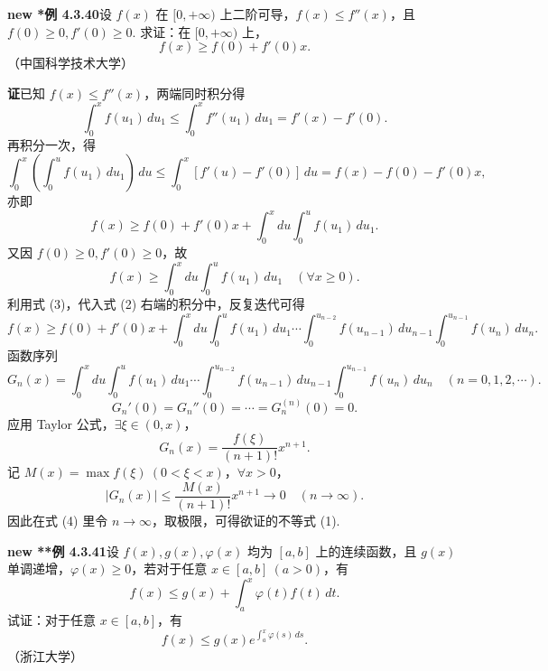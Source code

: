 \documentclass[UTF8, 12pt, fontset=fandol, oneside]{ctexart}
\begin{document}
\noindent\textbf{new *例 4.3.40}\quad 设 $f(x)$ 在 $[0,+\infty)$ 上二阶可导，$f(x)\le f''(x)$，且 $f(0)\ge0,f'(0)\ge0$. 求证：在 $[0,+\infty)$ 上，
\[
f(x)\ge f(0)+f'(0)x.
\tag{1}
\]
（中国科学技术大学）

\noindent\textbf{证}\quad 已知 $f(x)\le f''(x)$，两端同时积分得
\[
\int_0^x f(u_1)\,du_1
\le\int_0^x f''(u_1)\,du_1
=f'(x)-f'(0).
\]
再积分一次，得
\[
\int_0^x\left(\int_0^u f(u_1)\,du_1\right)\,du
\le\int_0^x[f'(u)-f'(0)]\,du
=f(x)-f(0)-f'(0)x,
\]
亦即
\[
f(x)\ge f(0)+f'(0)x+\int_0^x du\int_0^u f(u_1)\,du_1.
\tag{2}
\]
又因 $f(0)\ge0,f'(0)\ge0$，故
\[
f(x)\ge\int_0^x du\int_0^u f(u_1)\,du_1\quad(\forall x\ge0).
\tag{3}
\]
利用式 (3)，代入式 (2) 右端的积分中，反复迭代可得
\[
f(x)\ge f(0)+f'(0)x
+\int_0^x du\int_0^u f(u_1)\,du_1\cdots
\int_0^{u_{n-2}}f(u_{n-1})\,du_{n-1}\int_0^{u_{n-1}}f(u_n)\,du_n.
\tag{4}
\]
函数序列
\[
G_n(x)=\int_0^x du\int_0^u f(u_1)\,du_1\cdots
\int_0^{u_{n-2}}f(u_{n-1})\,du_{n-1}\int_0^{u_{n-1}}f(u_n)\,du_n
\quad(n=0,1,2,\cdots).
\]
\[
G_n'(0)=G_n''(0)=\cdots=G_n^{(n)}(0)=0.
\]
应用 Taylor 公式，$\exists\xi\in(0,x)$，
\[
G_n(x)=\frac{f(\xi)}{(n+1)!}x^{n+1}.
\]
记 $M(x)=\max f(\xi)\ (0<\xi<x)$，$\forall x>0$，
\[
|G_n(x)|\le\frac{M(x)}{(n+1)!}x^{n+1}\to0\quad(n\to\infty).
\]
因此在式 (4) 里令 $n\to\infty$，取极限，可得欲证的不等式 (1).

\noindent\textbf{new **例 4.3.41}\quad 设 $f(x),g(x),\varphi(x)$ 均为 $[a,b]$ 上的连续函数，且 $g(x)$ 单调递增，$\varphi(x)\ge0$，若对于任意 $x\in[a,b]\ (a>0)$，有
\[
f(x)\le g(x)+\int_a^x\varphi(t)f(t)\,dt.
\tag{1}
\]
试证：对于任意 $x\in[a,b]$，有
\[
f(x)\le g(x)e^{\int_a^x\varphi(s)\,ds}.
\tag{2}
\]
（浙江大学）
\end{document}
